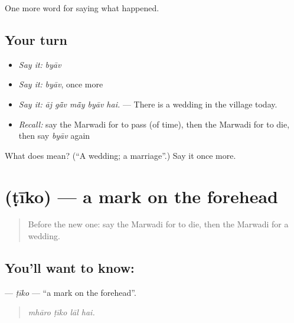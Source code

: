 \begin{grammarlens}[title={What you've built}]
One more word for saying what happened.
\end{grammarlens}

\subsection*{Your turn}
\begin{itemize}
\raggedright
  \item \emph{Say it:} \emph{byāv}
  \item \emph{Say it:} \emph{byāv}, once more
  \item \emph{Say it:} \emph{āj gā̃v mā̃y byāv hai.} — There is a wedding in the village today.
  \item \emph{Recall:} say the Marwadi for to pass (of time), then the Marwadi for to die, then say \emph{byāv} again
\end{itemize}

\begin{tcolorbox}[breakable,colback=teal!4,colframe=teal!35!black,title={Before you move on}]
What does  mean? (\textquotedblleft{}A wedding; a marriage\textquotedblright{}.) Say it once more.
\end{tcolorbox}
\section[\texorpdfstring{\mw{टीको} (ṭīko)}{टीको (ṭīko)}]{ (ṭīko) — a mark on the forehead}

\label{lesson:MW-C247-tiko}



\begin{quote}
Before the new one: say the Marwadi for to die, then the Marwadi for a wedding.
\end{quote}

\subsection*{You'll want to know: }
\textbf{} — \emph{ṭīko} — \textquotedblleft{}a mark on the forehead\textquotedblright{}.

\begin{quote}
   
\end{quote}

\begin{quote}
\emph{mhāro ṭīko lāl hai.}
\end{quote}

